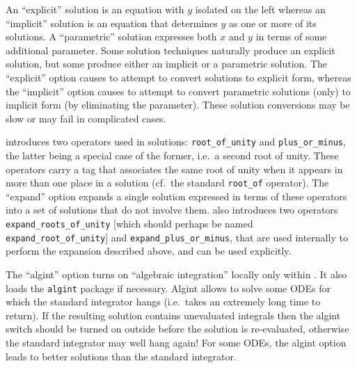 An ``explicit'' solution is an equation with $y$ isolated on the left
whereas an ``implicit'' solution is an equation that determines $y$ as
one or more of its solutions.  A ``parametric'' solution expresses
both $x$ and $y$ in terms of some additional parameter.  Some solution
techniques naturally produce an explicit solution, but some produce
either an implicit or a parametric solution.  The ``explicit'' option
causes  to attempt to convert solutions to explicit form,
whereas the ``implicit'' option causes  to attempt to
convert parametric solutions (only) to implicit form (by eliminating
the parameter).  These solution conversions may be slow or may fail in
complicated cases.

 introduces two operators used in solutions:
\texttt{root\_of\_unity} and \texttt{plus\_or\_minus}, the latter
being a special case of the former, i.e.\ a second root of unity.
These operators carry a tag that associates the same root of unity
when it appears in more than one place in a solution (cf.\ the
standard \texttt{root\_of} operator).  The ``expand'' option expands a
single solution expressed in terms of these operators into a set of
solutions that do not involve them.   also introduces two
operators \texttt{expand\_roots\_of\_unity} [which should perhaps be
named \texttt{expand\_root\_of\_unity}] and
\texttt{expand\_plus\_or\_minus}, that are used internally to perform
the expansion described above, and can be used explicitly.

The ``algint'' option turns on ``algebraic integration'' locally only
within .  It also loads the \texttt{algint} package if
necessary.  Algint allows  to solve some ODEs for which
the standard \REDUCE{} integrator hangs (i.e.\ takes an extremely long
time to return).  If the resulting solution contains unevaluated
integrals then the algint switch should be turned on outside
 before the solution is re-evaluated, otherwise the
standard integrator may well hang again!  For some ODEs, the algint
option leads to better solutions than the standard \REDUCE{}
integrator.

